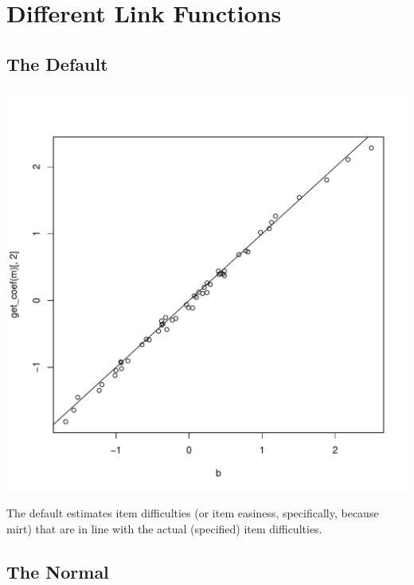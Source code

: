 \documentclass{article}\usepackage[]{graphicx}\usepackage[]{color}
\makeatletter
\def\maxwidth{ %
  \ifdim\Gin@nat@width>\linewidth
    \linewidth
  \else
    \Gin@nat@width
  \fi
}
\newenvironment{knitrout}{}{} %
\makeatother
\begin{document}
\section{Different Link Functions}
\subsection{The Default}
\begin{knitrout}
\color{fgcolor}
\includegraphics[width=\maxwidth]{figure/unnamed-chunk-9-1} 

\end{knitrout}

The default estimates item difficulties (or item easiness, specifically, because mirt) that are in line with the actual (specified) item difficulties.

\subsection{The Normal}
\end{document}
